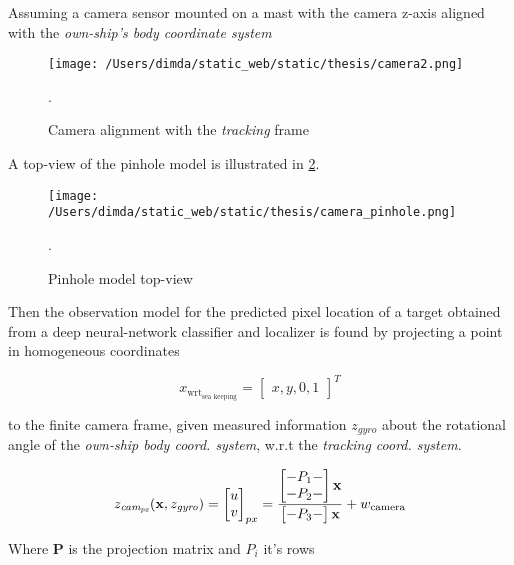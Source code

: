 Assuming a camera sensor mounted on a mast with the camera z-axis aligned with the \emph{own-ship's body coordinate system}



\begin{figure}[H]
	\centering
	\texttt{[image: /Users/dimda/static\_web/static/thesis/camera2.png]}
	\caption{Camera alignment with the \emph{tracking} frame}.
	\label{fig:camera_alignment_tracking}
\end{figure}

A top-view of the pinhole model is illustrated in \cref{fig:camera_pinhole}.


\begin{figure}[H]
	\centering
	\texttt{[image: /Users/dimda/static\_web/static/thesis/camera\_pinhole.png]}
	\caption{Pinhole model top-view}.
	\label{fig:camera_pinhole}
\end{figure}


Then the observation model for the predicted pixel location of a target obtained from a deep neural-network classifier and localizer is found by projecting a point in homogeneous coordinates


\begin{equation}
x_{\text{wrt}_{\text{sea keeping}}} =\begin{bmatrix}x, y, 0, 1\end{bmatrix}^T
\end{equation}


to the finite camera frame, given measured information $z_{gyro}$ about the rotational angle of the \emph{own-ship body coord. system}, w.r.t the \emph{tracking coord. system}.



\begin{equation}
z_{\textit{cam}_{\textit{px}}}(\mathbf{x},z_{\textit{gyro}}) = \begin{bmatrix}u\\v\end{bmatrix}_{px}= \frac{\begin{bmatrix}-P_1-\\-P_2-\end{bmatrix}\mathbf{x}}{
	\begin{bmatrix}
	-P_3-
	\end{bmatrix}
	\mathbf{x}}+ {w}_{\text{camera}}
\end{equation}


Where $\mathbf{P}$ is the projection matrix and $P_{i}$ it's rows

